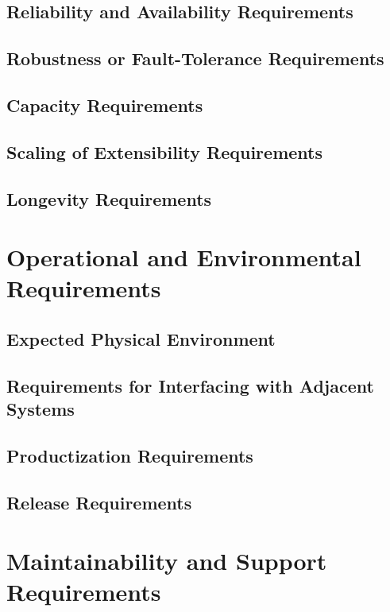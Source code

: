 \documentclass{scrreprt}
\begin{document}
\subsection{Reliability and Availability Requirements}

\subsection{Robustness or Fault-Tolerance Requirements}

\subsection{Capacity Requirements}

\subsection{Scaling of Extensibility Requirements}

\subsection{Longevity Requirements}

\section{Operational and Environmental Requirements}

\subsection{Expected Physical Environment}

\subsection{Requirements for Interfacing with Adjacent Systems}

\subsection{Productization Requirements}

\subsection{Release Requirements}

\section{Maintainability and Support Requirements}
\end{document}
